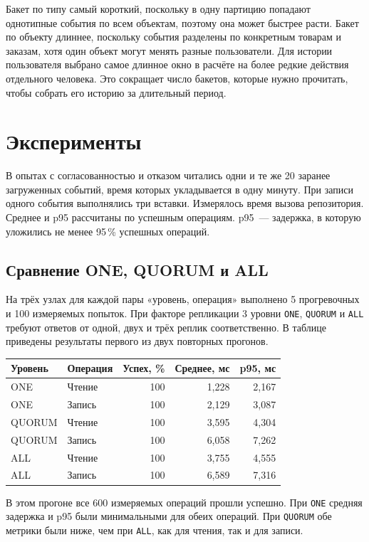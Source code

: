 \documentclass[12pt,a4paper]{article}
\begin{document}
Бакет по типу самый короткий, поскольку в одну партицию попадают однотипные события по всем объектам, поэтому она может быстрее расти. Бакет по объекту длиннее, поскольку события разделены по конкретным товарам и заказам, хотя один объект могут менять разные пользователи. Для истории пользователя выбрано самое длинное окно в расчёте на более редкие действия отдельного человека. Это сокращает число бакетов, которые нужно прочитать, чтобы собрать его историю за длительный период.

\section{Эксперименты}

В опытах с согласованностью и отказом читались одни и те же 20 заранее загруженных событий, время которых укладывается в одну минуту. При записи одного события выполнялись три вставки. Измерялось время вызова репозитория. Среднее и p95 рассчитаны по успешным операциям. p95~— задержка, в которую уложились не менее 95\,\% успешных операций.

\subsection{Сравнение ONE, QUORUM и ALL}

На трёх узлах для каждой пары «уровень, операция» выполнено 5 прогревочных и 100 измеряемых попыток. При факторе репликации 3 уровни \texttt{ONE}, \texttt{QUORUM} и \texttt{ALL} требуют ответов от одной, двух и трёх реплик соответственно. В таблице приведены результаты первого из двух повторных прогонов.

\begin{center}
\begin{tabular}{@{}llrrr@{}}
\toprule
Уровень & Операция & Успех, \% & Среднее, мс & p95, мс \\
\midrule
ONE & Чтение & 100 & 1,228 & 2,167 \\
ONE & Запись & 100 & 2,129 & 3,087 \\
QUORUM & Чтение & 100 & 3,595 & 4,304 \\
QUORUM & Запись & 100 & 6,058 & 7,262 \\
ALL & Чтение & 100 & 3,755 & 4,555 \\
ALL & Запись & 100 & 6,589 & 7,316 \\
\bottomrule
\end{tabular}
\end{center}

В этом прогоне все 600 измеряемых операций прошли успешно. При \texttt{ONE} средняя задержка и p95 были минимальными для обеих операций. При \texttt{QUORUM} обе метрики были ниже, чем при \texttt{ALL}, как для чтения, так и для записи.
\end{document}
